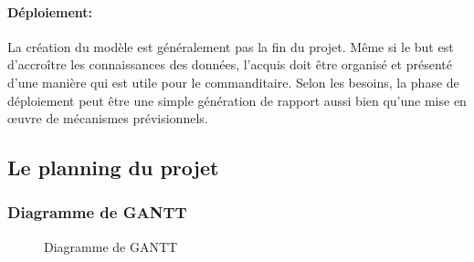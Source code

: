 	\paragraph{Déploiement:}
	La création du modèle est généralement pas la fin du projet. Même si le but est d'accroître les connaissances des données, l'acquis doit être organisé et présenté d'une manière qui est utile pour le commanditaire. Selon les besoins, la phase de déploiement peut être une simple génération de rapport aussi bien qu'une mise en œuvre de mécanismes prévisionnels.
	

	\begin{landscape}
	\subsection{Le planning du projet}
	\subsubsection{Diagramme de GANTT}
		\begin{figure}[H]
    			\centering
    			\caption{Diagramme de GANTT}
    			\label{fig:gantt}
		\end{figure}
	\end{landscape}
	

